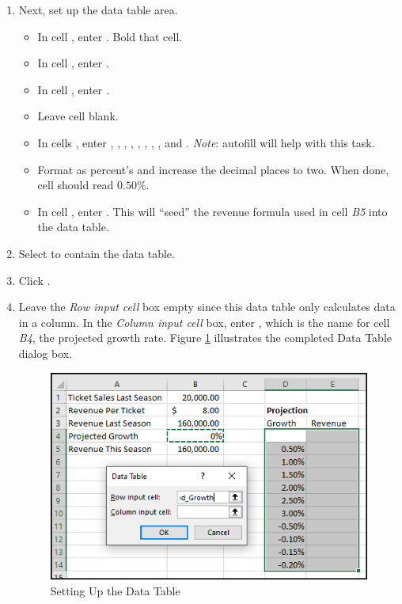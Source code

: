 \begin{enumbox}
\begin{enumerate}
		\item Next, set up the data table area.
	\begin{itemize}
		\item In cell , enter . Bold that cell.
		\item In cell , enter .
		\item In cell , enter .
		\item Leave cell  blank.
		\item In cells , enter , , , , , , , ,  and . \textit{Note}: autofill will help with this task.
		\item Format  as percent's and increase the decimal places to two. When done, cell  should read $ 0.50 $\%.
		\item In cell , enter . This will ``seed'' the revenue formula used in cell \textit{B5} into the data table.
	\end{itemize}
	
		\item Select  to contain the data table.
		\item Click .
		\item Leave the \textit{Row input cell} box empty since this data table only calculates data in a column. In the \textit{Column input cell} box, enter , which is the name for cell \textit{B4}, the projected growth rate. Figure \ref{08:fig41} illustrates the completed Data Table dialog box.
		
		\begin{figure}[H]
			\centering
			\includegraphics[width=\maxwidth{.95\linewidth}]{gfx/ch08_fig41}
			\caption{Setting Up the Data Table}
			\label{08:fig41}
		\end{figure}


\end{enumerate}
\end{enumbox}
